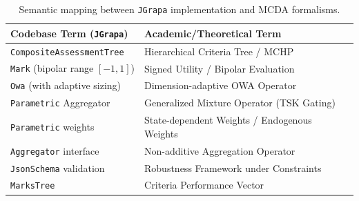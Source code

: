 \documentclass[12pt,a4paper]{article}
\begin{document}
\begin{table}[h!]
\centering
\small
\begin{tabular}{ll}
\toprule
\textbf{Codebase Term (\texttt{JGrapa})} & \textbf{Academic/Theoretical Term} \\
\midrule
\texttt{CompositeAssessmentTree} & Hierarchical Criteria Tree / MCHP \\
\texttt{Mark} (bipolar range $[-1, 1]$) & Signed Utility / Bipolar Evaluation \\
\texttt{Owa} (with adaptive sizing) & Dimension-adaptive OWA Operator \\
\texttt{Parametric} Aggregator & Generalized Mixture Operator (TSK Gating) \\
\texttt{Parametric} weights & State-dependent Weights / Endogenous Weights \\
\texttt{Aggregator} interface & Non-additive Aggregation Operator \\
\texttt{JsonSchema} validation & Robustness Framework under Constraints \\
\texttt{MarksTree} & Criteria Performance Vector \\
\bottomrule
\end{tabular}
\caption{Semantic mapping between \texttt{JGrapa} implementation and MCDA formalisms.}
\end{table}
\end{document}
